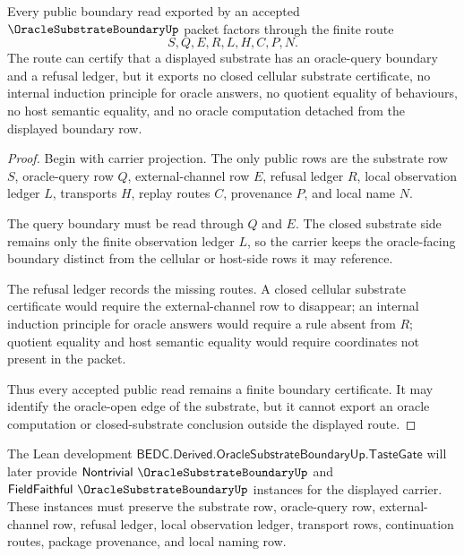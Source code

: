 \begin{theorem}
\label{thm:oracle-substrate-boundary-external-channel-nonescape}
Every public boundary read exported by an accepted $\OracleSubstrateBoundaryUp$ packet factors through the finite route
$$
S,Q,E,R,L,H,C,P,N .
$$
The route can certify that a displayed substrate has an oracle-query boundary and a refusal ledger, but it exports no closed cellular substrate certificate, no internal induction principle for oracle answers, no quotient equality of behaviours, no host semantic equality, and no oracle computation detached from the displayed boundary row.
\end{theorem}
\begin{proof}
Begin with carrier projection. The only public rows are the substrate row $S$, oracle-query row $Q$, external-channel row $E$, refusal ledger $R$, local observation ledger $L$, transports $H$, replay routes $C$, provenance $P$, and local name $N$.

The query boundary must be read through $Q$ and $E$. The closed substrate side remains only the finite observation ledger $L$, so the carrier keeps the oracle-facing boundary distinct from the cellular or host-side rows it may reference.

The refusal ledger records the missing routes. A closed cellular substrate certificate would require the external-channel row to disappear; an internal induction principle for oracle answers would require a rule absent from $R$; quotient equality and host semantic equality would require coordinates not present in the packet.

Thus every accepted public read remains a finite boundary certificate. It may identify the oracle-open edge of the substrate, but it cannot export an oracle computation or closed-substrate conclusion outside the displayed route.
\end{proof}

The Lean development $\mathsf{BEDC.Derived.OracleSubstrateBoundaryUp.TasteGate}$ will later provide $\mathsf{Nontrivial}\ \OracleSubstrateBoundaryUp$ and $\mathsf{FieldFaithful}\ \OracleSubstrateBoundaryUp$ instances for the displayed carrier. These instances must preserve the substrate row, oracle-query row, external-channel row, refusal ledger, local observation ledger, transport rows, continuation routes, package provenance, and local naming row.


